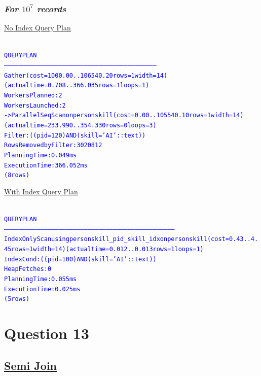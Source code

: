 \documentclass{article}
\begin{document}
    \subsubsection*{\emph{For $10^7$ records}}
    \underline{No Index Query Plan}
    \begin{center}
      {\tiny
      \begin{alltt}
      \textcolor{blue}{
        QUERY PLAN                                                          
        ------------------------------------------------------------------------------------------------------------------------------
         Gather  (cost=1000.00..106540.20 rows=1 width=14) (actual time=0.708..366.035 rows=1 loops=1)
           Workers Planned: 2
           Workers Launched: 2
           ->  Parallel Seq Scan on personskill  (cost=0.00..105540.10 rows=1 width=14) (actual time=233.990..354.330 rows=0 loops=3)
                 Filter: ((pid = 120) AND (skill = 'AI'::text))
                 Rows Removed by Filter: 3020812
         Planning Time: 0.049 ms
         Execution Time: 366.052 ms
        (8 rows)
       }
      \end{alltt}
      }
    \end{center}
    \underline{With Index Query Plan}
    \begin{center}
      {\tiny
      \begin{alltt}
      \textcolor{blue}{
        QUERY PLAN                                                                  
        ---------------------------------------------------------------------------------------------------------------------------------------------
         Index Only Scan using personskill_pid_skill_idx on personskill  (cost=0.43..4.45 rows=1 width=14) (actual time=0.012..0.013 rows=1 loops=1)
           Index Cond: ((pid = 100) AND (skill = 'AI'::text))
           Heap Fetches: 0
         Planning Time: 0.055 ms
         Execution Time: 0.025 ms
        (5 rows)
       }
      \end{alltt}
      }
    \end{center}

    \section*{Question 13}
    \subsection*{\underline{Semi Join}}
\end{document}
